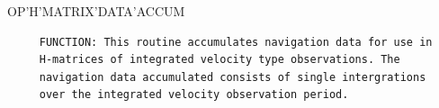 \begin{frame}
OP'H'MATRIX'DATA'ACCUM
\begin{verbatim}
     FUNCTION: This routine accumulates navigation data for use in
     H-matrices of integrated velocity type observations. The 
     navigation data accumulated consists of single intergrations
     over the integrated velocity observation period.


\end{verbatim}
\end{frame}
